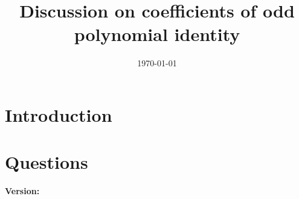 \documentclass[12pt,letterpaper,oneside,reqno]{amsart}
\title[Discussion on coefficients of odd polynomial identity]
{Discussion on coefficients of odd polynomial identity}
\date{\today}
\begin{document}
    \begin{abstract}
        
    \end{abstract}

    \maketitle


    \section{Introduction} \label{sec:introduction}
    

    \section{Questions}\label{sec:questions}
    

    \clearpage

    
    
    \noindent \textbf{Version:} 
\end{document}
